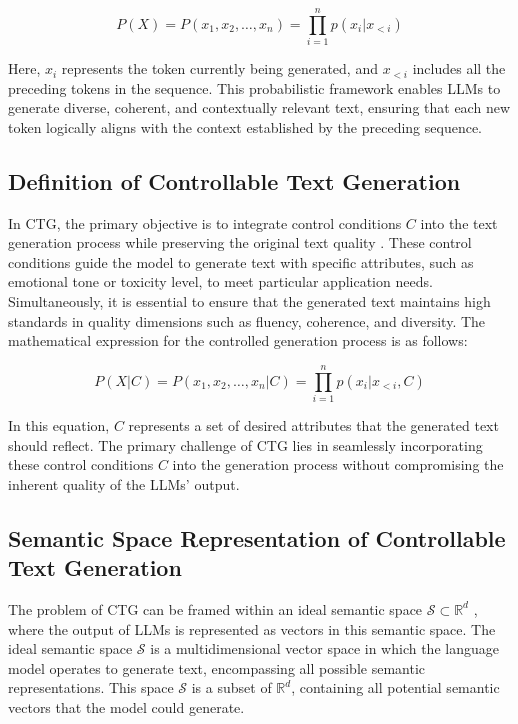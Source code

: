 \documentclass[acmsmall, screen]{acmart}
\begin{document}
\begin{equation}
P(X) = P(x_1, x_2, \ldots, x_n) = \prod_{i=1}^{n} p(x_i | x_{<i})
\end{equation}

Here, \(x_i\) represents the token currently being generated, and \(x_{<i}\) includes all the preceding tokens in the sequence. This probabilistic framework enables LLMs to generate diverse, coherent, and contextually relevant text, ensuring that each new token logically aligns with the context established by the preceding sequence.

\subsection{Definition of Controllable Text Generation}
In CTG, the primary objective is to integrate control conditions \(C\) into the text generation process while preserving the original text quality \cite{zhang_ACMCS23_CTGSurvey}. These control conditions guide the model to generate text with specific attributes, such as emotional tone or toxicity level, to meet particular application needs. Simultaneously, it is essential to ensure that the generated text maintains high standards in quality dimensions such as fluency, coherence, and diversity. The mathematical expression for the controlled generation process is as follows:

\begin{equation}
P(X | C) = P(x_1, x_2, \ldots, x_n | C) = \prod_{i=1}^{n} p(x_i | x_{<i}, C)
\end{equation}

In this equation, \(C\) represents a set of desired attributes that the generated text should reflect. The primary challenge of CTG lies in seamlessly incorporating these control conditions \(C\) into the generation process without compromising the inherent quality of the LLMs' output.

\subsection{Semantic Space Representation of Controllable Text Generation}
The problem of CTG can be framed within an ideal semantic space \(\mathcal{S} \subset \mathbb{R}^d\) \cite{liang_arxiv24_DATG}, where the output of LLMs is represented as vectors in this semantic space. The ideal semantic space \(\mathcal{S}\) is a multidimensional vector space in which the language model operates to generate text, encompassing all possible semantic representations. This space \(\mathcal{S}\) is a subset of \(\mathbb{R}^d\), containing all potential semantic vectors that the model could generate.
\end{document}
